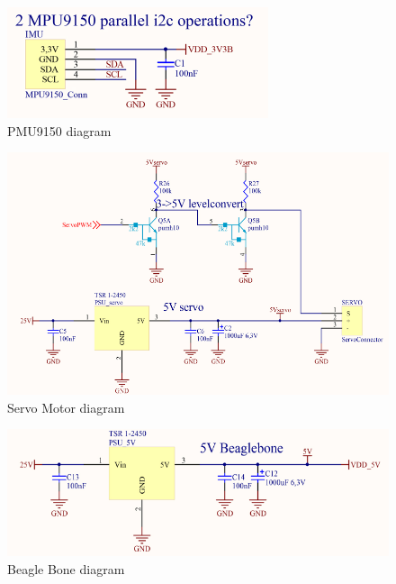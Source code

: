 \begin{figure}[H]
	\centering
	\includegraphics[scale=0.92]{figures/PMU9150.pdf}
	\caption{PMU9150 diagram}
	\label{labPMU9150}
\end{figure}\vspace{-5mm}


\begin{figure}[H]
	\centering
	\includegraphics[scale=0.92]{figures/ServoMotor.pdf}
	\caption{Servo Motor diagram}
	\label{labServoMotor}
\end{figure}\vspace{-5mm}


\begin{figure}[H]
	\centering
	\includegraphics[scale=0.92]{figures/BeagleBone.pdf}
	\caption{Beagle Bone diagram}
	\label{labBeagleBone}
\end{figure}\vspace{-5mm}


